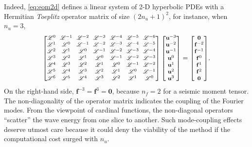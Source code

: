 \documentclass[extra]{gji}
\begin{document}
Indeed, \eqref{eq:eom2d} defines a linear system of 2-D hyperbolic PDEs with 
a Hermitian \textit{Toeplitz} \cite[Chap 4,][]{golub2012matrix}
operator matrix of size $\left(2n_u+1\right)^2$, 
for instance, when $n_u=3$, 
\begin{equation}
  {\footnotesize
  \setlength{\arraycolsep}{3pt}
  \begin{bmatrix}\mathscr{L}^{0} & \mathscr{L}^{-1} & \mathscr{L}^{-2} & \mathscr{L}^{-3} & \mathscr{L}^{-4}& \mathscr{L}^{-5} & \mathscr{L}^{-6}\\
  \mathscr{L}^{1} & \mathscr{L}^{0} & \mathscr{L}^{-1} & \mathscr{L}^{-2} & \mathscr{L}^{-3}& \mathscr{L}^{-4} & \mathscr{L}^{-5}\\
  \mathscr{L}^{2} & \mathscr{L}^{1} & \mathscr{L}^{0} & \mathscr{L}^{-1} & \mathscr{L}^{-2}& \mathscr{L}^{-3} & \mathscr{L}^{-4}\\
  \mathscr{L}^{3} & \mathscr{L}^{2} & \mathscr{L}^{1} & \mathscr{L}^{0} & \mathscr{L}^{-1}& \mathscr{L}^{-2} & \mathscr{L}^{-3}\\
  \mathscr{L}^{4} & \mathscr{L}^{3} & \mathscr{L}^{2} & \mathscr{L}^{1} & \mathscr{L}^{0}& \mathscr{L}^{-1} & \mathscr{L}^{-2}\\
  \mathscr{L}^{5} & \mathscr{L}^{4} & \mathscr{L}^{3} & \mathscr{L}^{2} & \mathscr{L}^{1}& \mathscr{L}^{0} & \mathscr{L}^{-1}\\
  \mathscr{L}^{6} & \mathscr{L}^{5} & \mathscr{L}^{4} & \mathscr{L}^{3} & \mathscr{L}^{2}& \mathscr{L}^{1} & \mathscr{L}^{0}
  \end{bmatrix}\begin{bmatrix}
  \mathbf{u}^{-3}\\
  \mathbf{u}^{-2}\\
  \mathbf{u}^{-1}\\
  \mathbf{u}^{0}\\
  \mathbf{u}^{1}\\
  \mathbf{u}^{2}\\
  \mathbf{u}^{3}
  \end{bmatrix}=\begin{bmatrix}
  \mathbf{0}\\
  \mathbf{f}^{-2}\\
  \mathbf{f}^{-1}\\
  \mathbf{f}^{0}\\
  \mathbf{f}^{1}\\
  \mathbf{f}^{2}\\
  \mathbf{0}
  \end{bmatrix}}.
  \label{eq:full5}
\end{equation}
On the right-hand side, $\mathbf{f}^{-3}=\mathbf{f}^{3}=\mathbf{0}$,
because $n_f=2$ for a seismic moment tensor.
The non-diagonality of the operator matrix indicates the coupling of 
the Fourier modes. From the viewpoint of cardinal functions, the non-diagonal
operators ``scatter'' the wave energy from one slice to another.  
Such mode-coupling effects deserve utmost
care because it could deny the viability of the method if the 
computational cost surged with $n_u$.
\end{document}
